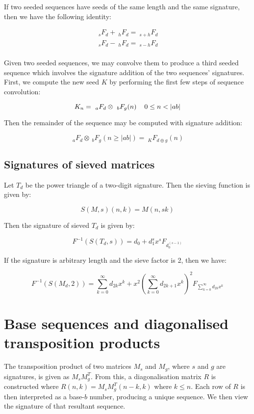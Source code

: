 \documentclass{article}
\begin{document}
\noindent If two seeded sequences have seeds of the same length and the same signature, then we have the following identity:

\begin{align*}
~_s F_d + ~_h F_d = ~_{s + h} F_d\\
~_s F_d - ~_h F_d = ~_{s - h} F_d\\
\end{align*}

\noindent Given two seeded sequences, we may convolve them to produce a third seeded sequence which involves the signature addition of the two sequences' signatures. First, we compute the new seed $K$ by performing the first few steps of sequence convolution:

$$K_n = ~_a F_d \otimes ~_b F_g (n) \hspace{4mm} 0 \leq n < |ab|$$

\noindent Then the remainder of the sequence may be computed with signature addition:

$$~_a F_d \otimes ~_b F_g (n \geq |ab|) = ~_K F_{d \oplus g}(n)$$

\subsection{Signatures of sieved matrices}

Let $T_d$ be the power triangle of a two-digit signature. Then the sieving function is given by:

$$S(M, s)(n, k) = M(n, sk)$$

\noindent Then the signature of sieved $T_d$ is given by:

$$F^{-1}(S(T_d, s)) = d_0 + d_1^s x^s F_{d_0^{(s-1)}}$$

\noindent If the signature is arbitrary length and the sieve factor is 2, then we have:

$$F^{-1}(S(M_d, 2)) = \sum_{k=0}^{\infty} d_{2k} x^k + x^2 \left( \sum_{k=0}^{\infty} d_{2k+1} x^k \right)^2 F_{\displaystyle \sum_{k=0}^{\infty} d_{2k} x^k}$$

\section{Base sequences and diagonalised transposition products}

The transposition product of two matrices $M_s$ and $M_g$, where $s$ and $g$ are signatures, is given as $M_s M_g^T$. From this, a diagonalisation matrix $R$ is constructed where $R(n,k) = M_s M_g^T (n-k, k)$ where $k \leq n$. Each row of $R$ is then interpreted as a base-$b$ number, producing a unique sequence. We then view the signature of that resultant sequence.\\
\end{document}
